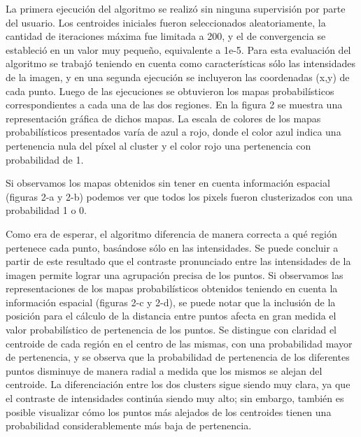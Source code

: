 La primera ejecución del algoritmo se realizó sin ninguna supervisión por parte del usuario. Los centroides iniciales fueron seleccionados aleatoriamente, la cantidad de iteraciones máxima fue limitada a 200, y el  de convergencia se estableció en un valor muy pequeño, equivalente a 1e-5. Para esta evaluación del algoritmo se trabajó teniendo en cuenta como características sólo las intensidades de la imagen, y en una segunda ejecución se incluyeron las coordenadas (x,y) de cada punto. Luego de las ejecuciones se obtuvieron los mapas probabilísticos correspondientes a cada una de las dos regiones. En la figura 2 se muestra una representación gráfica de dichos mapas. La escala de colores de los mapas probabilísticos presentados varía de azul a rojo, donde el color azul indica una pertenencia nula del píxel al cluster y el color rojo una pertenencia con probabilidad de 1.

Si observamos los mapas obtenidos sin tener en cuenta información espacial (figuras 2-a y 2-b) podemos ver que todos los pixels fueron clusterizados con una probabilidad 1 o 0.

Como era de esperar, el algoritmo diferencia de manera correcta a qué región pertenece cada punto, basándose sólo en las intensidades. Se puede concluir a partir de este resultado que el contraste pronunciado entre las intensidades de la imagen permite lograr una agrupación precisa de los puntos.
Si observamos las representaciones de los mapas probabilísticos obtenidos teniendo en cuenta la información espacial (figuras 2-c y 2-d), se puede notar que la inclusión de la posición para el cálculo de la distancia entre puntos afecta en gran medida el valor probabilístico de pertenencia de los puntos. Se distingue con claridad el centroide de cada región en el centro de las mismas, con una probabilidad mayor de pertenencia, y se observa que la probabilidad de pertenencia de los diferentes puntos disminuye de manera radial a medida que los mismos se alejan del centroide. La diferenciación entre los dos clusters sigue siendo muy clara, ya que el contraste de intensidades continúa siendo muy alto; sin embargo, también es posible visualizar cómo los puntos más alejados de los centroides tienen una probabilidad considerablemente más baja de pertenencia.
